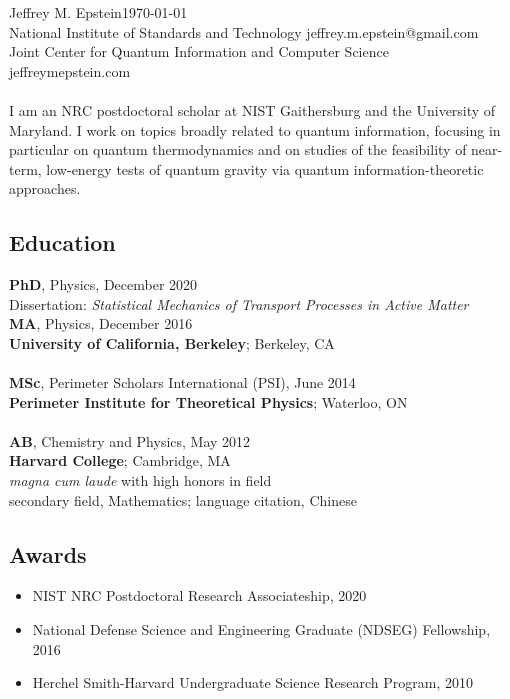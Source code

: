\documentclass[]{article}
\begin{document}
\noindent \large Jeffrey M. Epstein\vspace{5pt}\hfill\small \today\\
National Institute of Standards and Technology \hfill jeffrey.m.epstein@gmail.com\\
Joint Center for Quantum Information and Computer Science \hfill jeffreymepstein.com
\\
\\
I am an NRC postdoctoral scholar at NIST Gaithersburg and the University of Maryland. I work on topics broadly related to quantum information, focusing in particular on quantum thermodynamics and on studies of the feasibility of near-term, low-energy tests of quantum gravity via quantum information-theoretic approaches.


\subsection*{Education}
\textbf{PhD}, Physics, December 2020\\
Dissertation: \textit{Statistical Mechanics of Transport Processes in Active Matter}\\
\textbf{MA}, Physics, December 2016\\
\textbf{University of California, Berkeley}; Berkeley, CA\\
\\
\textbf{MSc}, Perimeter Scholars International (PSI), June 2014\\
\textbf{Perimeter Institute for Theoretical Physics}; Waterloo, ON\\
\\
\textbf{AB}, Chemistry and Physics, May 2012\\
\textbf{Harvard College}; Cambridge, MA\\
\textit{magna cum laude} with high honors in field\\
secondary field, Mathematics; language citation, Chinese


\subsection*{Awards}
\begin{itemize}
	\item NIST NRC Postdoctoral Research Associateship, 2020
	\item National Defense Science and Engineering Graduate (NDSEG) Fellowship, 2016
	\item Herchel Smith-Harvard Undergraduate Science Research Program, 2010
\end{itemize}
\end{document}
